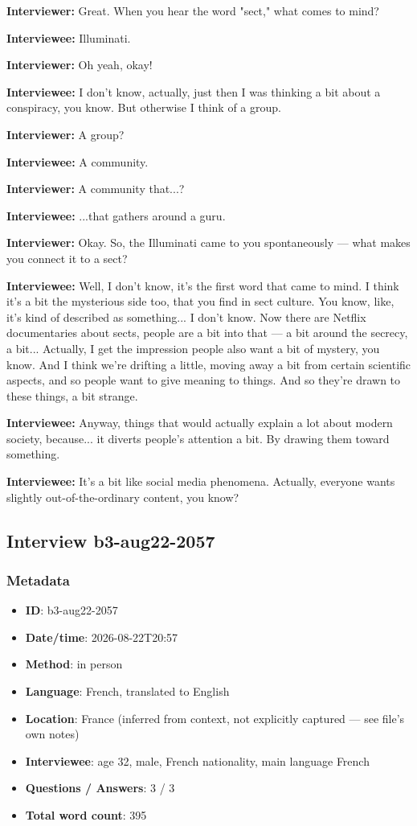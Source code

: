 \textbf{Interviewer:} Great. When you hear the word "sect," what comes to mind?

\textbf{Interviewee:} Illuminati.

\textbf{Interviewer:} Oh yeah, okay!

\textbf{Interviewee:} I don't know, actually, just then I was thinking a bit about a conspiracy, you know. But otherwise I think of a group.

\textbf{Interviewer:} A group?

\textbf{Interviewee:} A community.

\textbf{Interviewer:} A community that...?

\textbf{Interviewee:} ...that gathers around a guru.

\textbf{Interviewer:} Okay. So, the Illuminati came to you spontaneously — what makes you connect it to a sect?

\textbf{Interviewee:} Well, I don't know, it's the first word that came to mind. I think it's a bit the mysterious side too, that you find in sect culture. You know, like, it's kind of described as something... I don't know. Now there are Netflix documentaries about sects, people are a bit into that — a bit around the secrecy, a bit... Actually, I get the impression people also want a bit of mystery, you know. And I think we're drifting a little, moving away a bit from certain scientific aspects, and so people want to give meaning to things. And so they're drawn to these things, a bit strange.

\textbf{Interviewee:} Anyway, things that would actually explain a lot about modern society, because... it diverts people's attention a bit. By drawing them toward something.

\textbf{Interviewee:} It's a bit like social media phenomena. Actually, everyone wants slightly out-of-the-ordinary content, you know?

\subsection{Interview b3-aug22-2057}\label{int:b3-aug22-2057}
\subsubsection*{Metadata}
\begin{itemize}
  \item \textbf{ID}: b3-aug22-2057
  \item \textbf{Date/time}: 2026-08-22T20:57
  \item \textbf{Method}: in person
  \item \textbf{Language}: French, translated to English
  \item \textbf{Location}: France (inferred from context, not explicitly captured — see file's own notes)
  \item \textbf{Interviewee}: age 32, male, French nationality, main language French
  \item \textbf{Questions / Answers}: 3 / 3
  \item \textbf{Total word count}: 395
\end{itemize}
